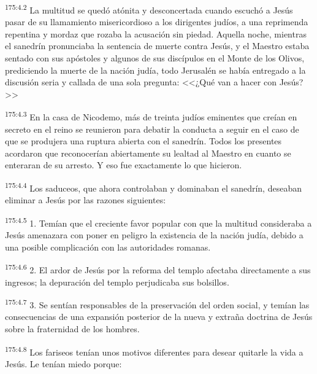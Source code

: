 \par 
\textsuperscript{175:4.2} La multitud se quedó atónita y desconcertada cuando escuchó a Jesús pasar de su llamamiento misericordioso a los dirigentes judíos, a una reprimenda repentina y mordaz que rozaba la acusación sin piedad. Aquella noche, mientras el sanedrín pronunciaba la sentencia de muerte contra Jesús, y el Maestro estaba sentado con sus apóstoles y algunos de sus discípulos en el Monte de los Olivos, prediciendo la muerte de la nación judía, todo Jerusalén se había entregado a la discusión seria y callada de una sola pregunta: <<¿Qué van a hacer con Jesús?>>

\par 
\textsuperscript{175:4.3} En la casa de Nicodemo, más de treinta judíos eminentes que creían en secreto en el reino se reunieron para debatir la conducta a seguir en el caso de que se produjera una ruptura abierta con el sanedrín. Todos los presentes acordaron que reconocerían abiertamente su lealtad al Maestro en cuanto se enteraran de su arresto. Y eso fue exactamente lo que hicieron.

\par 
\textsuperscript{175:4.4} Los saduceos, que ahora controlaban y dominaban el sanedrín, deseaban eliminar a Jesús por las razones siguientes:

\par 
\textsuperscript{175:4.5} 1. Temían que el creciente favor popular con que la multitud consideraba a Jesús amenazara con poner en peligro la existencia de la nación judía, debido a una posible complicación con las autoridades romanas.

\par 
\textsuperscript{175:4.6} 2. El ardor de Jesús por la reforma del templo afectaba directamente a sus ingresos; la depuración del templo perjudicaba sus bolsillos.

\par 
\textsuperscript{175:4.7} 3. Se sentían responsables de la preservación del orden social, y temían las consecuencias de una expansión posterior de la nueva y extraña doctrina de Jesús sobre la fraternidad de los hombres.

\par 
\textsuperscript{175:4.8} Los fariseos tenían unos motivos diferentes para desear quitarle la vida a Jesús. Le tenían miedo porque:

